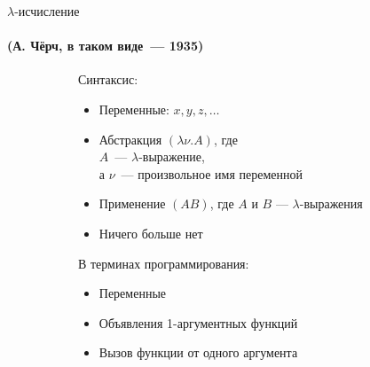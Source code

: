 \begin{frame}{$\lambda$-исчисление}
\framesubtitle{(А. Чёрч, в таком виде~--- 1935)}
\begin{figure}[t]
  \begin{subfigure}[t]{0.5\textwidth}
    \vspace{-5em}
    \vspace{-1em}
    Синтаксис:
    \begin{itemize}
      \item Переменные: $x,y,z,\dots$
      \item Абстракция $(\lambda \nu. A)$, где \\
      $A$~--- $\lambda$-выражение, \\
      а $\nu$~--- произвольное имя переменной
      \item Применение $(AB)$, где $A$ и $B$ --- $\lambda$-выражения
      \item Ничего больше нет
    \end{itemize}
  \end{subfigure}
\hspace{1cm}
  \begin{subfigure}[t]{0.4 \textwidth}

      \vspace{-5.5em}
В терминах программирования:
\begin{itemize}
  \item Переменные
  \item Объявления 1-аргументных функций
  \item Вызов функции от одного аргумента
\end{itemize}
\end{subfigure}
\end{figure}
\end{frame}

